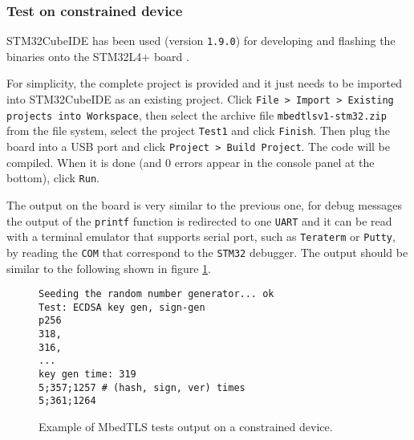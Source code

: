 \subsubsection{Test on constrained device}
STM32CubeIDE \cite{cube-ide} has been used (version \texttt{1.9.0}) for developing and flashing the binaries onto the STM32L4+ board \cite{stm32-board-product}.

For simplicity, the complete project is provided and it just needs to be imported into STM32CubeIDE as an existing project. Click \texttt{File > Import > Existing projects into Workspace}, then select the archive file \texttt{mbedtlsv1-stm32.zip} from the file system, select the project \texttt{Test1} and click \texttt{Finish}. Then plug the board into a USB port and click \texttt{Project > Build Project}. The code will be compiled. When it is done (and 0 errors appear in the console panel at the bottom), click \texttt{Run}. 

The output on the board is very similar to the previous one, for debug messages the output of the \texttt{printf} function is redirected to one \texttt{UART} and it can be read with a terminal emulator that supports serial port, such as \texttt{Teraterm} or \texttt{Putty}, by reading the \texttt{COM} that correspond to the \texttt{STM32} debugger. 
The output should be similar to the following shown in figure \ref{l-mbedtls-2}. \\
\begin{figure}[H]
\begin{lstlisting}[frame=single]
Seeding the random number generator... ok
Test: ECDSA key gen, sign-gen
p256
318,
316,
...
key gen time: 319
5;357;1257 # (hash, sign, ver) times
5;361;1264
\end{lstlisting}
\caption{Example of MbedTLS tests output on a constrained device. \label{l-mbedtls-2}}
\end{figure}




